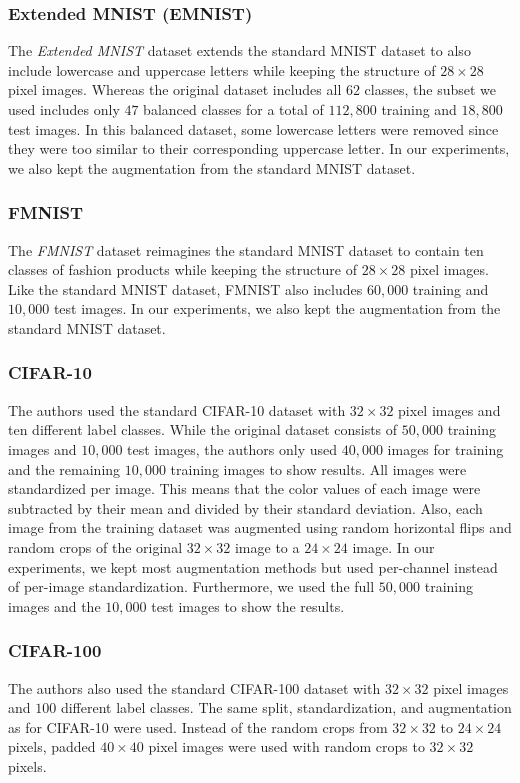 \subsubsection{Extended MNIST (EMNIST)}\label{emnist}
The \textit{Extended MNIST} dataset \cite{cohen2017} extends the standard MNIST dataset to also include lowercase and uppercase letters while keeping the structure of $28\times 28$ pixel images. Whereas the original dataset includes all $62$ classes, the subset we used includes only $47$ balanced classes for a total of $112,800$ training and $18,800$ test images. In this balanced dataset, some lowercase letters were removed since they were too similar to their corresponding uppercase letter. In our experiments, we also kept the augmentation from the standard MNIST dataset.

\subsubsection{FMNIST}\label{fmnist}
The \textit{FMNIST} dataset \cite{xiao2017} reimagines the standard MNIST dataset to contain ten classes of fashion products while keeping the structure of $28\times 28$ pixel images. Like the standard MNIST dataset, FMNIST also includes $60,000$ training and $10,000$ test images. In our experiments, we also kept the augmentation from the standard MNIST dataset.

\subsubsection{CIFAR-10} \label{cifar10}
The authors used the standard CIFAR-10 dataset \cite{krizhevsky2009} with $32\times32$ pixel images and ten different label classes. While the original dataset consists of $50,000$ training images and $10,000$ test images, the authors only used $40,000$ images for training and the remaining $10,000$ training images to show results. All images were standardized per image. This means that the color values of each image were subtracted by their mean and divided by their standard deviation. Also, each image from the training dataset was augmented using random horizontal flips and random crops of the original $32\times32$ image to a $24\times24$ image. In our experiments, we kept most augmentation methods but used per-channel instead of per-image standardization. Furthermore, we used the full $50,000$ training images and the $10,000$ test images to show the results.

\subsubsection{CIFAR-100} \label{cifar100}
The authors also used the standard CIFAR-100 dataset \cite{krizhevsky2009} with $32\times32$ pixel images and $100$ different label classes. The same split, standardization, and augmentation as for CIFAR-10 were used. Instead of the random crops from $32\times32$ to $24\times24$ pixels, padded $40\times40$ pixel images were used with random crops to $32\times32$ pixels.

